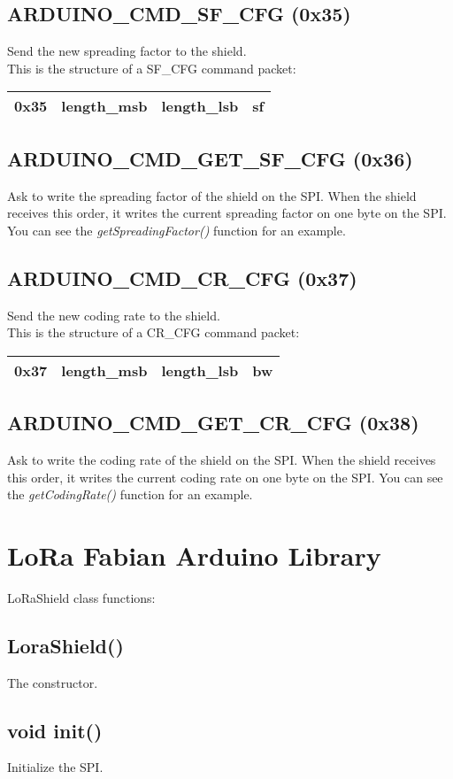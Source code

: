\documentclass{article}
\begin{document}
\subsection{ARDUINO\_CMD\_SF\_CFG (0x35)}
Send the new spreading factor to the shield.\\
This is the structure of a SF\_CFG command packet:
\begin{tabular}{|c|c|c|c|}
\hline
0x35 & length\_msb & length\_lsb & sf\\
\hline
\end{tabular}
\subsection{ARDUINO\_CMD\_GET\_SF\_CFG (0x36)}
Ask to write the spreading factor of the shield on the SPI. When the shield receives this order, it writes the current spreading factor on one byte on the SPI. You can see the \emph{getSpreadingFactor()} function for an example.
\subsection{ARDUINO\_CMD\_CR\_CFG (0x37)}
Send the new coding rate to the shield.\\
This is the structure of a CR\_CFG command packet:
\begin{tabular}{|c|c|c|c|}
\hline
0x37 & length\_msb & length\_lsb & bw\\
\hline
\end{tabular}
\subsection{ARDUINO\_CMD\_GET\_CR\_CFG (0x38)}
Ask to write the coding rate of the shield on the SPI. When the shield receives this order, it writes the current coding rate on one byte on the SPI. You can see the \emph{getCodingRate()} function for an example.
\section{LoRa Fabian Arduino Library}
LoRaShield class functions:
\subsection{LoraShield()}
The constructor.
\subsection{void init()}
Initialize the SPI.
\end{document}
